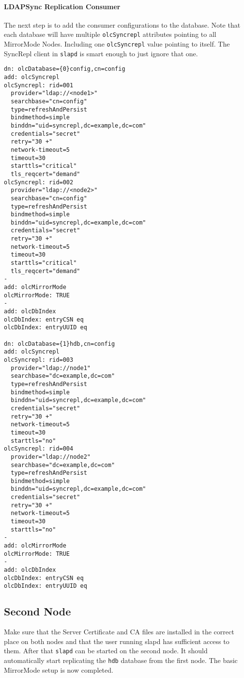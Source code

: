 \documentclass[a4paper,11pt,DIV=12]{scrartcl}
\begin{document}
\paragraph{LDAPSync Replication Consumer}
    The next step is to add the consumer configurations to the database. Note
    that each database will have multiple \verb|olcSyncrepl| attributes
    pointing to all MirrorMode Nodes. Including one \verb|olcSyncrepl| value
    pointing to itself. The SyncRepl client in \verb|slapd| is smart enough to
    just ignore that one.
    \begin{verbatim}
dn: olcDatabase={0}config,cn=config
add: olcSyncrepl
olcSyncrepl: rid=001
  provider="ldap://<node1>"
  searchbase="cn=config"
  type=refreshAndPersist
  bindmethod=simple
  binddn="uid=syncrepl,dc=example,dc=com"
  credentials="secret"
  retry="30 +"
  network-timeout=5
  timeout=30
  starttls="critical"
  tls_reqcert="demand"
olcSyncrepl: rid=002
  provider="ldap://<node2>"
  searchbase="cn=config"
  type=refreshAndPersist
  bindmethod=simple
  binddn="uid=syncrepl,dc=example,dc=com"
  credentials="secret"
  retry="30 +"
  network-timeout=5
  timeout=30
  starttls="critical"
  tls_reqcert="demand"
-
add: olcMirrorMode
olcMirrorMode: TRUE
-
add: olcDbIndex
olcDbIndex: entryCSN eq
olcDbIndex: entryUUID eq

dn: olcDatabase={1}hdb,cn=config
add: olcSyncrepl
olcSyncrepl: rid=003
  provider="ldap://node1"
  searchbase="dc=example,dc=com"
  type=refreshAndPersist
  bindmethod=simple
  binddn="uid=syncrepl,dc=example,dc=com"
  credentials="secret"
  retry="30 +"
  network-timeout=5
  timeout=30
  starttls="no"
olcSyncrepl: rid=004
  provider="ldap://node2"
  searchbase="dc=example,dc=com"
  type=refreshAndPersist
  bindmethod=simple
  binddn="uid=syncrepl,dc=example,dc=com"
  credentials="secret"
  retry="30 +"
  network-timeout=5
  timeout=30
  starttls="no"
-
add: olcMirrorMode
olcMirrorMode: TRUE
-
add: olcDbIndex
olcDbIndex: entryCSN eq
olcDbIndex: entryUUID eq
    \end{verbatim}

\subsection{Second Node}
    Make sure that the Server Certificate and CA files are installed in the
    correct place on both nodes and that the user running slapd has sufficient
    access to them. After that \verb|slapd| can be started on the second node.
    It should automatically start replicating the \verb|hdb| database from the
    first node. The basic MirrorMode setup is now completed.
\end{document}
